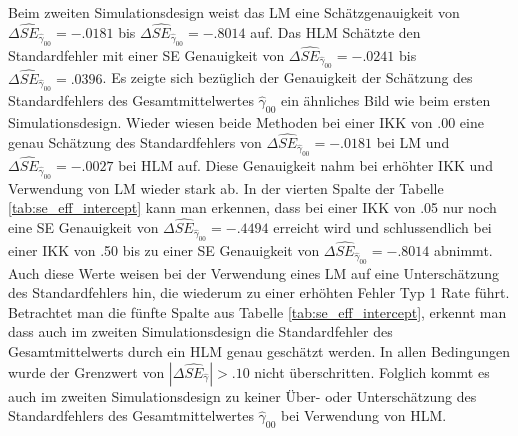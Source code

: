 \documentclass[12pt]{article}\usepackage[]{graphicx}\usepackage[]{color}
\begin{document}
Beim zweiten Simulationsdesign weist das LM eine Schätzgenauigkeit von $\Delta\widehat{SE}_{\widehat{\gamma}_{00}} = -.0181$ bis $\Delta\widehat{SE}_{\widehat{\gamma}_{00}} = -.8014$ auf. Das HLM Schätzte den Standardfehler mit einer SE Genauigkeit von $\Delta\widehat{SE}_{\widehat{\gamma}_{00}} = -.0241$ bis $\Delta\widehat{SE}_{\widehat{\gamma}_{00}} = .0396$. Es zeigte sich bezüglich der Genauigkeit der Schätzung des Standardfehlers des Gesamtmittelwertes $\widehat{\gamma}_{00}$ ein ähnliches Bild wie beim ersten Simulationsdesign. Wieder wiesen beide Methoden bei einer IKK von .00 eine genau Schätzung des Standardfehlers von $\Delta\widehat{SE}_{\widehat{\gamma}_{00}} = -.0181$ bei LM und $\Delta\widehat{SE}_{\widehat{\gamma}_{00}} = -.0027$ bei HLM auf. Diese Genauigkeit nahm bei erhöhter IKK und Verwendung von LM wieder stark ab. In der vierten Spalte der Tabelle \ref{tab:se_eff_intercept} kann man erkennen, dass bei einer IKK von .05 nur noch eine SE Genauigkeit von $\Delta\widehat{SE}_{\widehat{\gamma}_{00}} = -.4494$ erreicht wird und schlussendlich bei einer IKK von .50 bis zu einer SE Genauigkeit von $\Delta\widehat{SE}_{\widehat{\gamma}_{00}} = -.8014$ abnimmt. Auch diese Werte weisen bei der Verwendung eines LM auf eine Unterschätzung des Standardfehlers hin, die wiederum zu einer erhöhten Fehler Typ 1 Rate führt. Betrachtet man die fünfte Spalte aus Tabelle \ref{tab:se_eff_intercept}, erkennt man dass auch im zweiten Simulationsdesign die Standardfehler des Gesamtmittelwerts durch ein HLM genau geschätzt werden. In allen Bedingungen wurde der Grenzwert von $|\Delta\widehat{SE}_{\widehat{\gamma}}| > .10$ nicht überschritten. Folglich kommt es auch im zweiten Simulationsdesign zu keiner Über- oder Unterschätzung des Standardfehlers des Gesamtmittelwertes $\widehat{\gamma}_{00}$ bei Verwendung von HLM.
\end{document}
